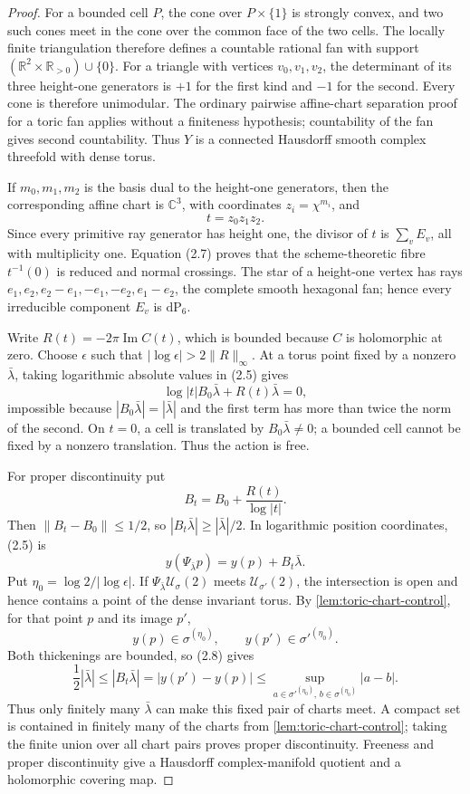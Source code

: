 \begin{proof}
For a bounded cell \(P\), the cone over \(P\times\{1\}\) is strongly
convex, and two such cones meet in the cone over the common face of the two
cells.  The locally finite triangulation therefore defines a countable
rational fan with support
\((\mathbb R^2\times\mathbb R_{>0})\cup\{0\}\).  For a triangle with
vertices \(v_0,v_1,v_2\), the determinant of its three height-one
generators is \(+1\) for the first kind and \(-1\) for the second.  Every
cone is therefore unimodular.  The ordinary pairwise affine-chart
separation proof for a toric fan applies without a finiteness hypothesis;
countability of the fan gives second countability.  Thus \(Y\) is a
connected Hausdorff smooth complex threefold with dense torus.

If \(m_0,m_1,m_2\) is the basis dual to the height-one generators, then the
corresponding affine chart is \(\mathbb C^3\), with coordinates
\(z_i=\chi^{m_i}\), and
\[
 t=z_0z_1z_2.
\tag{2.7}
\]
Since every primitive ray generator has height one, the divisor of \(t\) is
\(\sum_vE_v\), all with multiplicity one.  Equation (2.7) proves that the
scheme-theoretic fibre \(t^{-1}(0)\) is reduced and normal crossings.
The star of a height-one vertex has rays
\(e_1,e_2,e_2-e_1,-e_1,-e_2,e_1-e_2\), the complete smooth hexagonal fan;
hence every irreducible component \(E_v\) is \(\mathrm{dP}_6\).

Write \(R(t)=-2\pi\operatorname{Im}C(t)\), which is bounded because \(C\)
is holomorphic at zero.  Choose \(\epsilon\) such that
\(|\log\epsilon|>2\|R\|_\infty\).  At a torus point fixed by a nonzero
\(\bar\lambda\), taking logarithmic absolute values in (2.5) gives
\[
 \log|t|B_0\bar\lambda+R(t)\bar\lambda=0,
\]
impossible because \(|B_0\bar\lambda|=|\bar\lambda|\) and the first term
has more than twice the norm of the second.  On \(t=0\), a cell is translated
by \(B_0\bar\lambda\ne0\); a bounded cell cannot be fixed by a nonzero
translation.  Thus the action is free.

For proper discontinuity put
\[
 B_t=B_0+\frac{R(t)}{\log|t|}.
\]
Then \(\|B_t-B_0\|\le1/2\), so
\(|B_t\bar\lambda|\ge|\bar\lambda|/2\).  In logarithmic position
coordinates, (2.5) is
\[
 y(\Psi_{\bar\lambda}p)=y(p)+B_t\bar\lambda.
\tag{2.8}
\]
Put \(\eta_0=\log2/|\log\epsilon|\).  If
\(\Psi_{\bar\lambda}\mathcal U_\sigma(2)\) meets
\(\mathcal U_{\sigma'}(2)\), the intersection is open and hence contains a
point of the dense invariant torus.  By \cref{lem:toric-chart-control}, for
that point \(p\) and its image \(p'\),
\[
 y(p)\in\sigma^{(\eta_0)},\qquad
 y(p')\in{\sigma'}^{(\eta_0)}.
\]
Both thickenings are bounded, so (2.8) gives
\[
 \frac12|\bar\lambda|
 \le |B_t\bar\lambda|
 =|y(p')-y(p)|
 \le \sup_{a\in{\sigma'}^{(\eta_0)},\,b\in\sigma^{(\eta_0)}}|a-b|.
\]
Thus only finitely many \(\bar\lambda\) can make this fixed pair of charts
meet.  A compact set is contained in finitely many of the charts from
\cref{lem:toric-chart-control}; taking the finite union over all chart pairs
proves proper discontinuity.  Freeness and proper discontinuity give a
Hausdorff complex-manifold quotient and a holomorphic covering map.


\end{proof}
